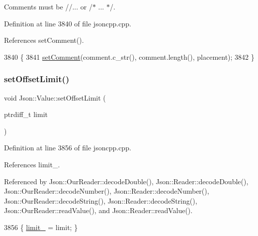 Comments must be //... or /$\ast$ ... $\ast$/. 



Definition at line 3840 of file jsoncpp.\+cpp.



References set\+Comment().


\begin{DoxyCode}
3840                                                                                 \{
3841   \hyperlink{class_json_1_1_value_a29f3a30f7e5d3af6f38d57999bf5b480}{setComment}(comment.c\_str(), comment.length(), placement);
3842 \}
\end{DoxyCode}
\mbox{\label{class_json_1_1_value_a5e4f5853fec138150c5df6004a8c2bcf}} 
\subsubsection{\texorpdfstring{set\+Offset\+Limit()}{setOffsetLimit()}}
{\footnotesize\ttfamily void Json\+::\+Value\+::set\+Offset\+Limit (\begin{DoxyParamCaption}\item[{ptrdiff\+\_\+t}]{limit }\end{DoxyParamCaption})}



Definition at line 3856 of file jsoncpp.\+cpp.



References limit\+\_\+.



Referenced by Json\+::\+Our\+Reader\+::decode\+Double(), Json\+::\+Reader\+::decode\+Double(), Json\+::\+Our\+Reader\+::decode\+Number(), Json\+::\+Reader\+::decode\+Number(), Json\+::\+Our\+Reader\+::decode\+String(), Json\+::\+Reader\+::decode\+String(), Json\+::\+Our\+Reader\+::read\+Value(), and Json\+::\+Reader\+::read\+Value().


\begin{DoxyCode}
3856 \{ \hyperlink{class_json_1_1_value_afe377e25f6d3b5b8ea7221c84f29412a}{limit\_} = limit; \}
\end{DoxyCode}
\mbox{\label{class_json_1_1_value_a92e32ea0f4f8a15853a3cf0beac9feb9}} 
